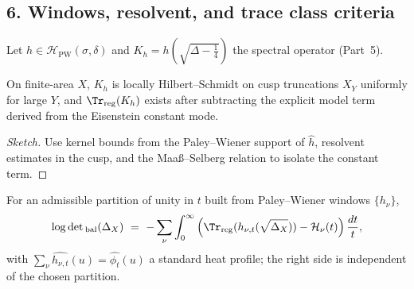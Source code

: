 \subsection*{6. Windows, resolvent, and trace class criteria}\relax\hspace{0pt}
\label{subsec:tfc7-windows}\relax\hspace{0pt}

Let $h\in\mathcal{H}_{\mathrm{PW}}(\sigma,\delta)$ and $K_h=h(\sqrt{\Delta-\tfrac14})$ the spectral operator (Part~5). \relax\hspace{0pt}
\begin{proposition}\relax\hspace{0pt}
\label{prop:tfc7-HS}\relax\hspace{0pt}
On finite-area $X$, $K_h$ is locally Hilbert--Schmidt on cusp truncations $X_Y$ uniformly for large $Y$, and $\Tr_{\mathrm{reg}}(K_h)$ exists after subtracting the explicit model term derived from the Eisenstein constant mode. \relax\hspace{0pt}
\end{proposition}

\begin{proof}[Sketch]\relax\hspace{0pt}
Use kernel bounds from the Paley--Wiener support of $\widehat{h}$, resolvent estimates in the cusp, and the Maaß--Selberg relation to isolate the constant term. \relax\hspace{0pt}
\end{proof}

\begin{corollary}\relax\hspace{0pt}
\label{cor:tfc7-window-det}\relax\hspace{0pt}
For an admissible partition of unity in $t$ built from Paley--Wiener windows $\{h_\nu\}$,
\[
\log\det{}_{\mathrm{bal}}(\Delta_X)\ =\ -\sum_\nu \int_0^\infty \Big(\Tr_{\mathrm{reg}}(h_{\nu,t}(\sqrt{\Delta_X})) - \mathcal{H}_\nu(t)\Big)\,\frac{dt}{t},
\]
with $\sum_\nu \widehat{h_{\nu,t}}(u)=\widehat{\phi_t}(u)$ a standard heat profile; the right side is independent of the chosen partition. \relax\hspace{0pt}
\end{corollary}

